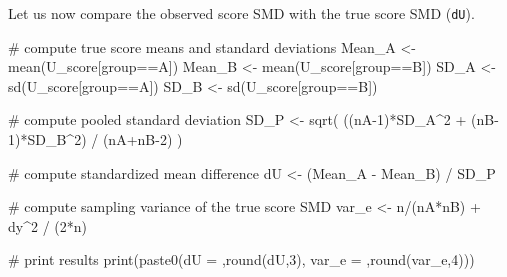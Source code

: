 \documentclass[
  letterpaper,
  DIV=11,
  numbers=noendperiod]{scrreprt}
\newenvironment{Shaded}{\begin{snugshade}}{\end{snugshade}}
\newcommand{\CommentTok}[1]{\textcolor[rgb]{0.37,0.37,0.37}{#1}}
\newcommand{\DecValTok}[1]{\textcolor[rgb]{0.68,0.00,0.00}{#1}}
\newcommand{\FunctionTok}[1]{\textcolor[rgb]{0.28,0.35,0.67}{#1}}
\newcommand{\NormalTok}[1]{\textcolor[rgb]{0.00,0.23,0.31}{#1}}
\newcommand{\OtherTok}[1]{\textcolor[rgb]{0.00,0.23,0.31}{#1}}
\newcommand{\SpecialCharTok}[1]{\textcolor[rgb]{0.37,0.37,0.37}{#1}}
\newcommand{\StringTok}[1]{\textcolor[rgb]{0.13,0.47,0.30}{#1}}
\begin{document}
Let us now compare the observed score SMD with the true score SMD
(\texttt{dU}).

\begin{Shaded}
\begin{Highlighting}[]
\CommentTok{\# compute true score means and standard deviations}
\NormalTok{Mean\_A }\OtherTok{\textless{}{-}} \FunctionTok{mean}\NormalTok{(U\_score[group}\SpecialCharTok{==}\StringTok{\textquotesingle{}A\textquotesingle{}}\NormalTok{])}
\NormalTok{Mean\_B }\OtherTok{\textless{}{-}} \FunctionTok{mean}\NormalTok{(U\_score[group}\SpecialCharTok{==}\StringTok{\textquotesingle{}B\textquotesingle{}}\NormalTok{])}
\NormalTok{SD\_A }\OtherTok{\textless{}{-}} \FunctionTok{sd}\NormalTok{(U\_score[group}\SpecialCharTok{==}\StringTok{\textquotesingle{}A\textquotesingle{}}\NormalTok{])}
\NormalTok{SD\_B }\OtherTok{\textless{}{-}} \FunctionTok{sd}\NormalTok{(U\_score[group}\SpecialCharTok{==}\StringTok{\textquotesingle{}B\textquotesingle{}}\NormalTok{])}

\CommentTok{\# compute pooled standard deviation}
\NormalTok{SD\_P }\OtherTok{\textless{}{-}} \FunctionTok{sqrt}\NormalTok{( ((nA}\DecValTok{{-}1}\NormalTok{)}\SpecialCharTok{*}\NormalTok{SD\_A}\SpecialCharTok{\^{}}\DecValTok{2} \SpecialCharTok{+}\NormalTok{ (nB}\DecValTok{{-}1}\NormalTok{)}\SpecialCharTok{*}\NormalTok{SD\_B}\SpecialCharTok{\^{}}\DecValTok{2}\NormalTok{) }\SpecialCharTok{/}\NormalTok{ (nA}\SpecialCharTok{+}\NormalTok{nB}\DecValTok{{-}2}\NormalTok{) )}

\CommentTok{\# compute standardized mean difference}
\NormalTok{dU }\OtherTok{\textless{}{-}}\NormalTok{ (Mean\_A }\SpecialCharTok{{-}}\NormalTok{ Mean\_B) }\SpecialCharTok{/}\NormalTok{ SD\_P}

\CommentTok{\# compute sampling variance of the true score SMD}
\NormalTok{var\_e }\OtherTok{\textless{}{-}}\NormalTok{ n}\SpecialCharTok{/}\NormalTok{(nA}\SpecialCharTok{*}\NormalTok{nB) }\SpecialCharTok{+}\NormalTok{ dy}\SpecialCharTok{\^{}}\DecValTok{2} \SpecialCharTok{/}\NormalTok{ (}\DecValTok{2}\SpecialCharTok{*}\NormalTok{n)}

\CommentTok{\# print results}
\FunctionTok{print}\NormalTok{(}\FunctionTok{paste0}\NormalTok{(}\StringTok{\textquotesingle{}dU = \textquotesingle{}}\NormalTok{,}\FunctionTok{round}\NormalTok{(dU,}\DecValTok{3}\NormalTok{),}\StringTok{\textquotesingle{}  var\_e = \textquotesingle{}}\NormalTok{,}\FunctionTok{round}\NormalTok{(var\_e,}\DecValTok{4}\NormalTok{)))}
\end{Highlighting}
\end{Shaded}
\end{document}
